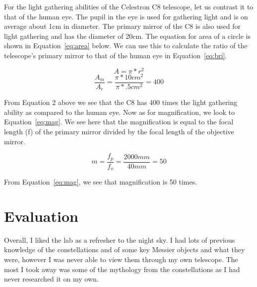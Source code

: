\documentclass{article}
\begin{document}
For the light gathering abilities of the Celestron C8 telescope, let us contrast it to that of the human eye. The pupil in the eye is used for
gathering light and is on average about 1cm in diameter. The primary mirror of the C8 is also used for light gathering and has 
the diameter of 20cm.  The equation for area of a circle is shown in Equation~\ref{eq:area} below. We can use this to calculate the ratio of the
telescope's primary mirror to that of the human eye in Equation~\ref{eq:bri}.

\begin{equation} \label{eq:area}
A = \pi * r^2
\end{equation}
\begin{equation} \label{eq:bri}
{\frac{A_m}{A_e}} = {\frac{\pi * 10cm^2}{\pi * .5cm^2}} = 400
\end{equation}

From Equation 2 above we see that the C8 has 400 times the light gathering ability as compared to the human eye. Now as for
magnification, we look to Equation~\ref{eq:mag}. We see here that the magnification is equal to the focal length (f) of the primary
mirror divided by the focal length of the objective mirror.

\begin{equation} \label{eq:mag}
m = {\frac{f_p}{f_o}} = {\frac{2000mm}{40mm}} = 50
\end{equation}

From Equation~\ref{eq:mag}, we see that magnification is 50 times.\\



\section{Evaluation}
Overall, I liked the lab as a refresher to the night sky. I had lots of previous knowledge of the constellations and of some key Messier
objects and what they were, however I was never able to view them through my own telescope. The most I took away was some of
the mythology from the constellations as I had never researched it on my own.


\end{document}
